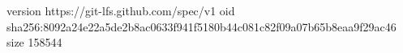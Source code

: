 version https://git-lfs.github.com/spec/v1
oid sha256:8092a24e22a5de2b8ac0633f941f5180b44c081c82f09a07b65b8eaa9f29ac46
size 158544
